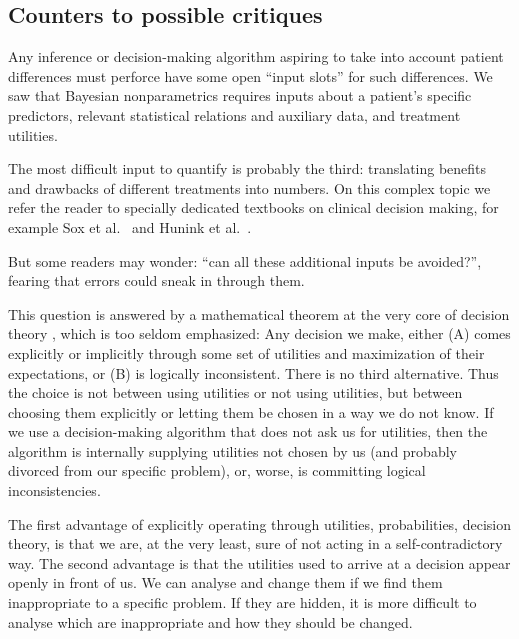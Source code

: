 \documentclass[a4paper,12pt,%
onecolumn,oneside,article,%
british%
]{memoir}
\theoremstyle{remark}
\theoremstyle{innote}
\newcommand*{\citey}{\cites*}
\renewcommand*{\|}[1][]{\nonscript\:#1\vert\nonscript\:\mathopen{}}
\newcommand*{\etal}{{et al.}}
\begin{document}
\subsection{Counters to possible critiques}
\label{sec:critics}

Any inference or decision-making algorithm aspiring to take into account patient differences must perforce have some open \enquote{input slots} for such differences. We saw that Bayesian nonparametrics requires inputs about a patient's specific predictors, relevant statistical relations and auxiliary data, and treatment utilities.

The most difficult input to quantify is probably the third: translating benefits and drawbacks of different treatments into numbers. On this complex topic we refer the reader to specially dedicated textbooks on clinical decision making, for example Sox \etal\ \citey{soxetal1988_r2013} and Hunink \etal\ \citey{huninketal2001_r2014}.


But some readers may wonder: \enquote{can all these additional inputs be avoided?}, fearing that errors could sneak in through them.

This question is answered by a mathematical theorem at the very core of decision theory \autocites{savage1954_r1972,luceetal1957,raiffaetal1961_r2000,atkinsonetal1964,ferguson1967,lindley1971_r1988,lindley1977,kreps1988,bernardoetal1994_r2000,prattetal1995_r1996,lindley2006_r2014,pettigrew2011_r2019}, which is too seldom emphasized: Any decision we make, either (A) comes explicitly or implicitly through some set of utilities and maximization of their expectations, or (B) is logically inconsistent. There is no third alternative. Thus the choice is not between using utilities or not using utilities, but between choosing them explicitly or letting them be chosen in a way we do not know. If we use a decision-making algorithm that does not ask us for utilities, then the algorithm is internally supplying utilities not chosen by us (and probably divorced from our specific problem), or, worse, is committing logical inconsistencies.

The first advantage of explicitly operating through utilities, probabilities, decision theory, is that we are, at the very least, sure of not acting in a self-contradictory way. The second advantage is that the utilities used to arrive at a decision appear openly in front of us. We can analyse and change them if we find them inappropriate to a specific problem. If they are hidden, it is more difficult to analyse which are inappropriate and how they should be changed.
\end{document}
